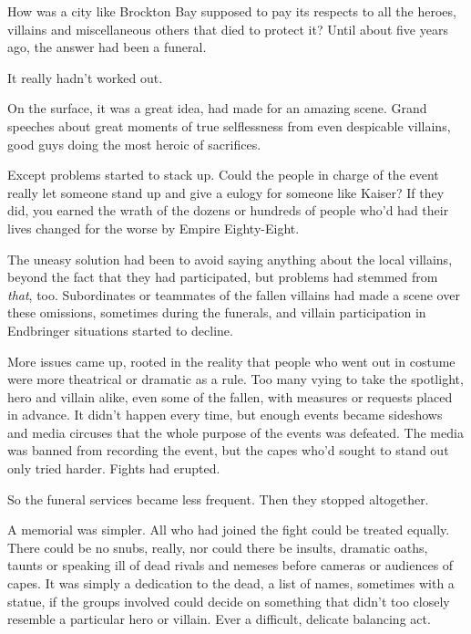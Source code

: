 





How was a city like Brockton Bay supposed to pay its respects to all the heroes, villains and miscellaneous others that died to protect it?  Until about five years ago, the answer had been a funeral.



It really hadn't worked out.



On the surface, it was a great idea, had made for an amazing scene.  Grand speeches about great moments of true selflessness from even despicable villains, good guys doing the most heroic of sacrifices.



Except problems started to stack up.  Could the people in charge of the event really let someone stand up and give a eulogy for someone like Kaiser?  If they did, you earned the wrath of the dozens or hundreds of people who'd had their lives changed for the worse by Empire Eighty-Eight.



The uneasy solution had been to avoid saying anything about the local villains, beyond the fact that they had participated, but problems had stemmed from \emph{that}, too.  Subordinates or teammates of the fallen villains had made a scene over these omissions, sometimes during the funerals, and villain participation in Endbringer situations started to decline.



More issues came up, rooted in the reality that people who went out in costume were more theatrical or dramatic as a rule.  Too many vying to take the spotlight, hero and villain alike, even some of the fallen, with measures or requests placed in advance.  It didn't happen every time, but enough events became sideshows and media circuses that the whole purpose of the events was defeated.  The media was banned from recording the event, but the capes who'd sought to stand out only tried harder.  Fights had erupted.



So the funeral services became less frequent.  Then they stopped altogether.



A memorial was simpler.  All who had joined the fight could be treated equally.  There could be no snubs, really, nor could there be insults, dramatic oaths, taunts or speaking ill of dead rivals and nemeses before cameras or audiences of capes.  It was simply a dedication to the dead, a list of names, sometimes with a statue, if the groups involved could decide on something that didn't too closely resemble a particular hero or villain.  Ever a difficult, delicate balancing act.



